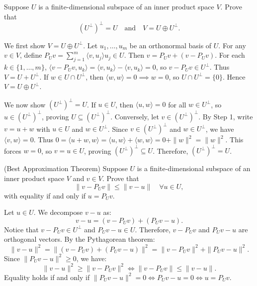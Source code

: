 \begin{xrcs}
  Suppose $U$ is a finite-dimensional subspace of an inner product space $V$. Prove that
  \begin{equation}
    (U^\perp)^\perp = U \quad \text{and} \quad V = U \oplus U^\perp.
  \end{equation}
\begin{xprf}
  \StepOne We first show $V = U \oplus U^\perp$.
  Let $u_1, \dots, u_m$ be an orthonormal basis of $U$.
  For any $v \in V$, define $P_U v = \sum_{j=1}^m \langle v, u_j \rangle u_j \in U$.
  Then $v = P_U v + (v - P_U v)$.
  For each $k \in \{1, \dots, m\}$, $\langle v - P_U v, u_k \rangle = \langle v, u_k \rangle - \langle v, u_k \rangle = 0$, so $v - P_U v \in U^\perp$.
  Thus $V = U + U^\perp$.
  If $w \in U \cap U^\perp$, then $\langle w, w \rangle = 0 \implies w = 0$, so $U \cap U^\perp = \{0\}$.
  Hence $V = U \oplus U^\perp$.

  \StepTwo We now show $(U^\perp)^\perp = U$.
  If $u \in U$, then $\langle u, w \rangle = 0$ for all $w \in U^\perp$, so $u \in (U^\perp)^\perp$, proving $U \subseteq (U^\perp)^\perp$.
  Conversely, let $v \in (U^\perp)^\perp$.
  By Step 1, write $v = u + w$ with $u \in U$ and $w \in U^\perp$.
  Since $v \in (U^\perp)^\perp$ and $w \in U^\perp$, we have $\langle v, w \rangle = 0$.
  Thus $0 = \langle u+w, w \rangle = \langle u, w \rangle + \langle w, w \rangle = 0 + \|w\|^2 = \|w\|^2$.
  This forces $w = 0$, so $v = u \in U$, proving $(U^\perp)^\perp \subseteq U$.
  Therefore, $(U^\perp)^\perp = U$.
\end{xprf}
\end{xrcs}

\begin{xrcs}
  (Best Approximation Theorem) Suppose $U$ is a finite-dimensional subspace of an inner product space $V$ and $v \in V$. Prove that
  \begin{equation}
    \|v - P_U v\| \leq \|v - u\| \quad \forall u \in U,
  \end{equation}
  with equality if and only if $u = P_U v$.
\begin{xprf}
  Let $u \in U$. We decompose $v - u$ as:
  \[
    v - u = (v - P_U v) + (P_U v - u).
  \]
  Notice that $v - P_U v \in U^\perp$ and $P_U v - u \in U$.
  Therefore, $v - P_U v$ and $P_U v - u$ are orthogonal vectors.
  By the Pythagorean theorem:
  \[
    \|v - u\|^2 = \|(v - P_U v) + (P_U v - u)\|^2 = \|v - P_U v\|^2 + \|P_U v - u\|^2.
  \]
  Since $\|P_U v - u\|^2 \geq 0$, we have:
  \[
    \|v - u\|^2 \geq \|v - P_U v\|^2 \iff \|v - P_U v\| \leq \|v - u\|.
  \]
  Equality holds if and only if $\|P_U v - u\|^2 = 0 \iff P_U v - u = 0 \iff u = P_U v$.
\end{xprf}
\end{xrcs}
